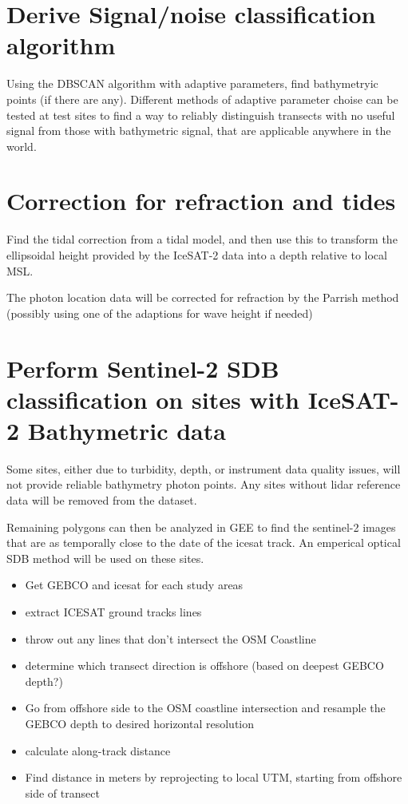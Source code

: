 \section{Derive Signal/noise classification algorithm}
Using the DBSCAN algorithm with adaptive parameters, find bathymetryic points (if there are any). Different methods of adaptive parameter choise can be tested at test sites to find a way to reliably distinguish transects with no useful signal from those with bathymetric signal, that are applicable anywhere in the world.

\section{Correction for refraction and tides}
Find the tidal correction from a tidal model, and then use this to transform the ellipsoidal height provided by the IceSAT-2 data into a depth relative to local MSL.

The photon location data will be corrected for refraction by the Parrish method (possibly using one of the adaptions for wave height if needed)

\section{Perform Sentinel-2 SDB classification on sites with IceSAT-2 Bathymetric data}
Some sites, either due to turbidity, depth, or instrument data quality issues, will not provide reliable bathymetry photon points. Any sites without lidar reference data will be removed from the dataset. 

Remaining polygons can then be analyzed in GEE to find the sentinel-2 images that are as temporally close to the date of the icesat track. An emperical optical SDB method will be used on these sites. 


\begin{itemize}
      \item Get GEBCO and icesat for each study areas
      \item extract ICESAT ground tracks lines
      \item throw out any lines that don't intersect the OSM Coastline
      \item determine which transect direction is offshore (based on deepest GEBCO depth?)
      \item Go from offshore side to the OSM coastline intersection and resample the GEBCO depth to desired horizontal resolution
      \item calculate along-track distance
      \item Find distance in meters by reprojecting to local UTM, starting from offshore side of transect
\end{itemize}

